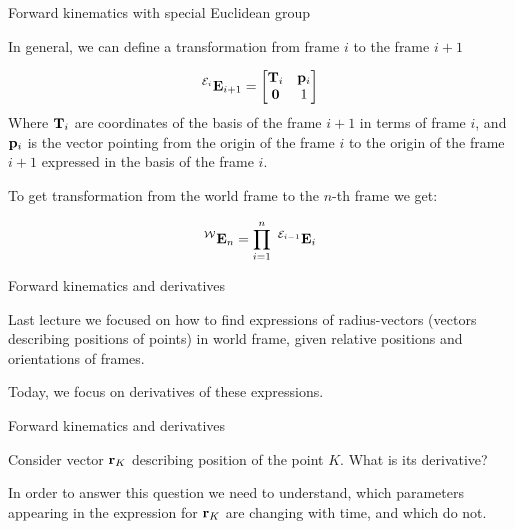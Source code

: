 \documentclass{beamer}
\begin{document}
\begin{frame}{Forward kinematics with special Euclidean group}
	\begin{flushleft}
		
		In general, we can define a transformation from frame $i$ to the frame $i+1$ 
		
		\begin{equation}
			^{\mathcal E_i}\mathbf{E}_{i+1} = 
			\begin{bmatrix}
				\mathbf{T}_i & \mathbf{p}_i \\
				\mathbf{0} & 1
			\end{bmatrix}
		\end{equation}		
	Where $\mathbf{T}_i$ are coordinates of the basis of the frame $i+1$ in terms of frame $i$, and $\mathbf{p}_i$ is the vector pointing from the origin of the  frame $i$ to the origin of the frame $i+1$ expressed in the basis of the frame $i$. 
		
		\bigskip
		
		To get transformation from the world frame to the $n$-th frame we get:
		
		
		\begin{equation}
			^{\mathcal W}\mathbf{E}_n = 
			\prod_{i=1}^n \
			^{\mathcal E_{i-1}}\mathbf{E}_i
		\end{equation}		
		
		
	\end{flushleft}
\end{frame}




\begin{frame}{Forward kinematics and derivatives}
	\begin{flushleft}
		
		Last lecture we focused on how to find expressions of radius-vectors (vectors describing positions of points) in world frame, given relative positions and orientations of frames.
		
		\bigskip
		
		Today, we focus on derivatives of these expressions.
		
	\end{flushleft}
\end{frame}


\begin{frame}{Forward kinematics and derivatives}
	\begin{flushleft}
		
		Consider vector $\mathbf{r}_K$ describing position of the point $K$. What is its derivative?
		
		\bigskip
		
		In order to answer this question we need to understand, which parameters appearing in the expression for $\mathbf{r}_K$ are changing with time, and which do not.
		
	\end{flushleft}
\end{frame}
\end{document}
